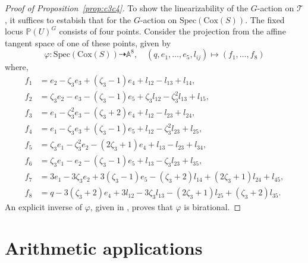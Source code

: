 \documentclass[12pt, reqno]{amsart}
\theoremstyle{plain}
\theoremstyle{remark}
\theoremstyle{definition}
\numberwithin{equation}{section}
\def\cT{{\mathcal T}}
\def\bA{{\mathbb A}}
\def\bP{{\mathbb P}}
\def\Cox{\mathrm{Cox}}
\def\Spec{\mathrm{Spec}}
\begin{document}
\begin{proof}[Proof of Proposition~\ref{prop:c3c4}]
To show the linearizability of the $G$-action on $\cT$, it suffices to estabish that for the $G$-action on $\Spec(\Cox(S))$. 
The fixed locus $\bP(U)^G$ consists of four points. 
Consider the projection from the affine tangent space of one of these points, given by 
$$
\varphi:\Spec(\Cox(S))\dashrightarrow \bA^8
,\quad (q,e_1,\ldots,e_5,l_{ij})\mapsto (f_1,\ldots,f_8)$$ where, 
\begin{align*}
f_1&=e_2 - \zeta_3e_3 + (\zeta_3 - 1)e_4 + l_{12} - l_{13} + l_{14},\\
f_2&=\zeta_3e_2 - e_3 - (\zeta_3 - 1)e_5 + \zeta_3l_{12} -\zeta_3^2l_{13} + l_{15},\\
f_3&=e_1 -\zeta_3^2e_3 -(\zeta_3 + 2)e_4 + l_{12} - l_{23} + l_{24},\\
f_4&=e_1 - \zeta_3e_3 + (\zeta_3 - 1)e_5 + l_{12} -\zeta_3^2l_{23} + l_{25},\\
f_5&=\zeta_3e_1 -\zeta_3^2e_2 - (2\zeta_3 + 1)e_4 + l_{13} - l_{23} + l_{34},\\
f_6&=\zeta_3e_1 - e_2 - (\zeta_3 - 1)e_5 + l_{13} - \zeta_3l_{23} + l_{35},\\
f_7&=3e_1 - 3\zeta_3e_2 + 3(\zeta_3 - 1)e_5 - (\zeta_3 + 2)l_{14} + (2\zeta_3 + 1)l_{24} 
    + l_{45},\\
f_8&=q - 3(\zeta_3 +2)e_4 + 3l_{12} - 3\zeta_3l_{13}- (2\zeta_3 + 1)l_{25} + (\zeta_3 + 
    2)l_{35}.
\end{align*}
An explicit inverse of $\varphi$, given in \cite{TZdp4-tables},
proves that $\varphi$ is birational.
\end{proof}

\section{Arithmetic applications}
\label{sect:arithm}
\end{document}

